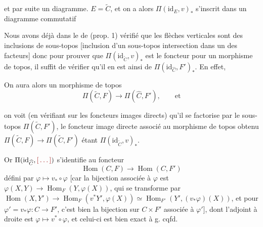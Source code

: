 \documentclass[11pt,a4paper]{article}
\begin{document}


et par suite un diagramme. $E = \widetilde{C}$, et on a alors
$\Pi(\mathrm{id}_{E}, v)_{*}$ s'inscrit dans un diagramme commutatif


Nous avons déjà \struck{\ill{}} dans le  de (prop. 1) vérifié
que les flèches verticales sont des inclusions de sous-topos [inclusion d'un
sous-topos intersection dans un des facteurs] donc pour prouver que
$\Pi(\mathrm{id}_{\widetilde{C}}, v)_{*}$ est \struck{\ill{}} le foncteur
 pour un morphisme de topos, il suffit de vérifier qu'il en
est ainsi de $\Pi(\mathrm{id}_{\widehat{C}}, F')_{*}$. En effet,

On aura alors un morphisme de topos
\[
\Pi(\widetilde{C}, F) \longrightarrow \Pi(\widehat{C}, F') ,
\qquad\text{et}
\]

on voit (en vérifiant sur les foncteurs images directs) qu'il se factorise par
le sous-topos $\Pi(\widetilde{C}, F')$, le foncteur image directe associé au
morphisme de \ill{} topos obtenu $\Pi(\widetilde{C}, F) \to
\Pi(\widetilde{C}, F')$ étant $\Pi(\mathrm{id}_{\widetilde{C}}, v)_{*}$.

Or $\Pi(\mathrm{id}_{\widehat{C}}, \ill{})$ s'identifie au foncteur
\[
\operatorname{Hom}(C, F) \longrightarrow \operatorname{Hom}(C, F')
\]
défini par \struck{\ill{}} $\varphi \mapsto v_{*} \circ \varphi$ [car la
bijection associée à $\varphi$ est $\varphi(X,Y) \to
\operatorname{Hom}_{F}(Y, \varphi(X))$, qui se transforme par
$\operatorname{Hom}(X,Y') \to \operatorname{Hom}_{F}(v^{*}Y', \varphi(X))
\simeq \operatorname{Hom}_{F'}(Y', (v_{*}\varphi)(X))$, et pour
$\varphi' = v_{*}\varphi : C \to F'$, c'est bien la bijection sur
$C \times F'$ associée à $\varphi'$], dont l'adjoint à droite est
$\varphi \mapsto v^{*} \circ \varphi$, et celui-ci est bien exact à g. cqfd.
\end{document}
